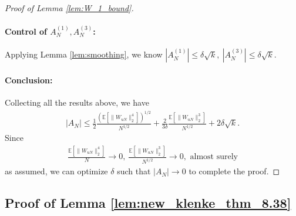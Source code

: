 \documentclass[12pt]{article}
\newcommand{\E}{\mathbb E}								%
\begin{document}
\begin{proof}[Proof of Lemma \ref{lem:W_1_bound}]
	\paragraph{Control of $A_{N}^{(1)},A_{N}^{(3)}$:}
	Applying Lemma \ref{lem:smoothing}, we know $|A_{N}^{(1)}|\leq \delta \sqrt{k},\ |A_{N}^{(3)}|\leq \delta \sqrt{k}$.
	
	\paragraph{Conclusion:}
	
	Collecting all the results above, we have 
	\begin{align*}
		|A_{N}|\leq \frac{1}{2}\frac{\left(\E[\|W_{uN}\|_2^4]\right)^{1/2}}{N^{1/2}}+\frac{2}{3\delta}\frac{\E[\|W_{uN}\|_2^3]}{N^{1/2}}+2\delta \sqrt{k}.
	\end{align*}
	Since 
	\begin{align*}
		\frac{\E[\|W_{uN}\|_2^4]}{N}\rightarrow 0,\ \frac{\E[\|W_{uN}\|_2^3]}{N^{1/2}}\rightarrow 0, \text{ almost surely}
	\end{align*}
	as assumed, we can optimize $\delta$ such that $|A_N|\rightarrow 0$ to complete the proof.
\end{proof}



\subsection{Proof of Lemma \ref{lem:new_klenke_thm_8.38}}
\end{document}
